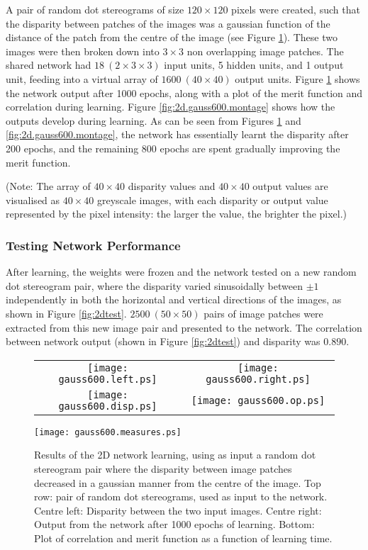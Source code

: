 \documentclass[a4paper]{article}
\begin{document}
A pair of random dot stereograms of size $120 \times 120$ pixels were
created, such that the disparity between patches of the images was a
gaussian function of the distance of the patch from the centre of the
image (see Figure \ref{fig:2dtrain}).  These two images were then
broken down into $3 \times 3$ non overlapping image patches.  The
shared network had $18\ ( 2 \times 3 \times 3)$ input units, 5 hidden
units, and 1 output unit, feeding into a virtual array of $1600\ (40
\times 40)$ output units.  Figure \ref{fig:2dtrain} shows the network
output after 1000 epochs, along with a plot of the merit function and
correlation during learning.  Figure \ref{fig:2d.gauss600.montage}
shows how the outputs develop during learning.  As can be seen from
Figures \ref{fig:2dtrain} and \ref{fig:2d.gauss600.montage}, the
network has essentially learnt the disparity after 200 epochs, and the
remaining 800 epochs are spent gradually improving the merit function.


(Note: The array of $40 \times 40$ disparity values and $40 \times 40$
output values are visualised as $40 \times 40$ greyscale images, with
each disparity or output value represented by the pixel intensity: the
larger the value, the brighter the pixel.)


\subsubsection{Testing Network Performance}

After learning, the weights were frozen and the network tested on
a new random dot stereogram pair, where the disparity varied
sinusoidally between $\pm 1$ independently in both the horizontal and
vertical directions of the images, as shown in Figure
\ref{fig:2dtest}. $2500\ (50 \times 50)$ pairs of image patches were
extracted from this new image pair and presented to the network.  The
correlation between network output (shown in Figure \ref{fig:2dtest})
and disparity was $0.890$.


\begin{figure}[htbp]
  \begin{center}

    \begin{tabular}{cc}
    \texttt{[image: gauss600.left.ps]} &
    \texttt{[image: gauss600.right.ps]}\\
    \texttt{[image: gauss600.disp.ps]} &
    \texttt{[image: gauss600.op.ps]}

    \end{tabular}
    \texttt{[image: gauss600.measures.ps]}
    \caption{Results of the 2D network learning, using as input a  random dot
      stereogram pair where the disparity between image patches
      decreased in a gaussian manner from the centre of the image.
      Top row: pair of random dot stereograms, used as input to the
      network.  Centre left: Disparity between the two input
      images.  Centre right: Output from the network after 1000 epochs
      of learning. Bottom: Plot of correlation and merit function
      as a function of learning time.}
    \label{fig:2dtrain}
  \end{center}
\end{figure}
\end{document}
